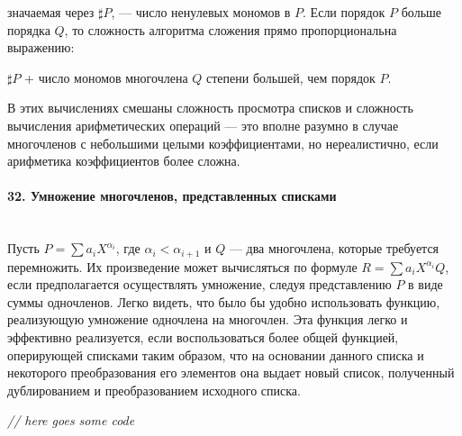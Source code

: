 \documentclass{../../template/mai_book}
\begin{document}
\noindent
значаемая через $\sharp P$, — число ненулевых мономов в $P$. Если порядок $P$ больше порядка $Q$, то сложность алгоритма сложения прямо пропорциональна выражению:

\begin{center}
$\sharp P$ + число мономов многочлена $Q$ степени большей, чем порядок $P$.
\end{center}

\noindent
В этих вычислениях смешаны сложность просмотра списков и сложность вычисления арифметических операций — это вполне разумно в случае многочленов с небольшими целыми коэффициентами, но нереалистично, если арифметика коэффициентов более сложна.

\paragraph{32. Умножение многочленов, представленных списками} \mbox{}\\

Пусть $P = \sum a_i X^{\alpha_i}$, где $\alpha_i < \alpha_{i + 1}$ и $Q$ — два многочлена, которые требуется перемножить. Их произведение может вычисляться по формуле $R = \sum a_i X^{\alpha_i}Q$, если предполагается осуществлять умножение, следуя представлению $P$ в виде суммы одночленов. Легко видеть, что было бы удобно использовать функцию, реализующую умножение одночлена на многочлен. Эта функция легко и эффективно  реализуется, если воспользоваться более общей функцией, оперирующей списками таким образом, что на основании данного списка и некоторого преобразования его элементов она выдает новый список, полученный дублированием и преобразованием исходного списка. \newline

\textit{// here goes some code}
\end{document}
